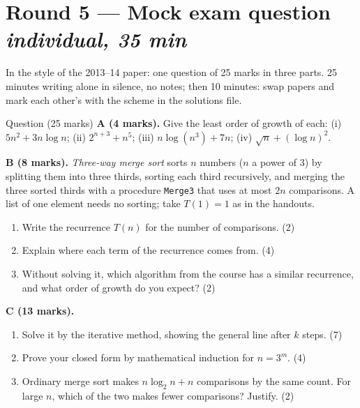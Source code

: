 \documentclass{fkt-notes}
\begin{document}
\section*{Round 5 --- Mock exam question \hfill\normalsize\emph{individual, 35 min}}

In the style of the 2013--14 paper: one question of 25 marks in three parts. 25 minutes writing alone in silence, no notes; then 10 minutes: swap papers and mark each other's with the scheme in the solutions file.

\begin{roundbox}{Question (25 marks)}
\textbf{A (4 marks).} Give the least order of growth of each:
(i) $5n^2+3n\log n$; \quad (ii) $2^{n+3}+n^5$; \quad (iii) $n\log(n^3)+7n$; \quad (iv) $\sqrt n+(\log n)^2$.

\smallskip
\textbf{B (8 marks).} \emph{Three-way merge sort} sorts $n$ numbers ($n$ a power of 3) by splitting them into three thirds, sorting each third recursively, and merging the three sorted thirds with a procedure \texttt{Merge3} that uses at most $2n$ comparisons. A list of one element needs no sorting; take $T(1)=1$ as in the handouts.
\begin{enumerate}[label=(\roman*),leftmargin=2em,itemsep=0pt]
  \item Write the recurrence $T(n)$ for the number of comparisons. \hfill (2)
  \item Explain where each term of the recurrence comes from. \hfill (4)
  \item Without solving it, which algorithm from the course has a similar recurrence, and what order of growth do you expect? \hfill (2)
\end{enumerate}

\smallskip
\textbf{C (13 marks).}
\begin{enumerate}[label=(\roman*),leftmargin=2em,itemsep=0pt]
  \item Solve it by the iterative method, showing the general line after $k$ steps. \hfill (7)
  \item Prove your closed form by mathematical induction for $n=3^m$. \hfill (4)
  \item Ordinary merge sort makes $n\log_2 n+n$ comparisons by the same count. For large $n$, which of the two makes fewer comparisons? Justify. \hfill (2)
\end{enumerate}
\end{roundbox}

\end{document}
